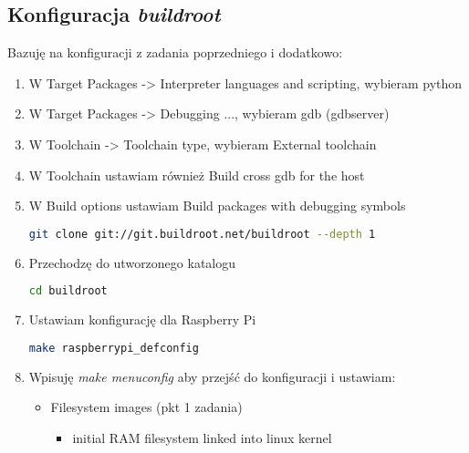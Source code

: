 \subsection{Konfiguracja \emph{buildroot}}
Bazuję na konfiguracji z zadania poprzedniego i dodatkowo:
\begin{enumerate}
	\item W Target Packages -> Interpreter languages and scripting, wybieram python
	\item W Target Packages -> Debugging ..., wybieram gdb (gdbserver)
	\item W Toolchain -> Toolchain type, wybieram External toolchain
	\item W Toolchain ustawiam również Build cross gdb for the host
	\item W Build options ustawiam Build packages with debugging symbols
	\begin{lstlisting}[language=bash]
	git clone git://git.buildroot.net/buildroot --depth 1
	\end{lstlisting}
	\item Przechodzę do utworzonego katalogu
	\begin{lstlisting}[language=bash]
	cd buildroot
	\end{lstlisting}	
	\item Ustawiam konfigurację dla Raspberry Pi
	\begin{lstlisting}[language=bash]
	make raspberrypi_defconfig
	\end{lstlisting}	
	\item Wpisuję \emph{make menuconfig} aby przejść do konfiguracji i ustawiam:
	\begin{itemize}	
		\item Filesystem images (pkt 1 zadania)
		\begin{itemize}
			\item initial RAM filesystem linked into linux kernel
		\end{itemize}
		

\end{itemize}
\end{enumerate}
